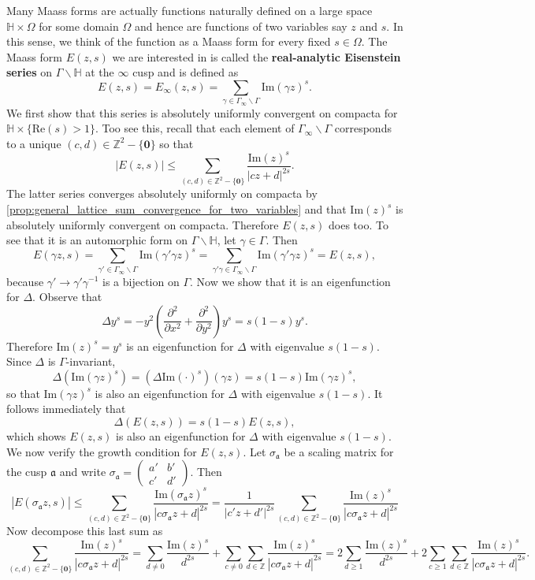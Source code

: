 \documentclass[12pt]{book}
\theoremstyle{definition}\newframedtheorem{method}{Method}
\newcommand{\mf}{\mathfrak}
\newcommand{\Z}{\mathbb{Z}}
\renewcommand{\H}{\mathbb{H}}
\newcommand{\g}{\gamma}
\newcommand{\s}{\sigma}
\newcommand{\G}{\Gamma}
\newcommand{\D}{\Delta}
\newcommand{\W}{\Omega}
\newcommand{\x}{\times}
\newcommand{\del}{\partial}
\newcommand{\<}{\langle}
\renewcommand{\>}{\rangle}
\renewcommand{\Re}{\mathrm{Re}}
\renewcommand{\Im}{\mathrm{Im}}
\newcommand{\GH}{\G\backslash\H}
\newcommand{\GG}{\G_{\infty}\backslash\G}
\begin{document}
      Many Maass forms are actually functions naturally defined on a large space $\H \x \W$ for some domain $\W$ and hence are functions of two variables say $z$ and $s$. In this sense, we think of the function as a Maass form for every fixed $s \in \W$. The Maass form $E(z,s)$ we are interested in is called the \textbf{real-analytic Eisenstein series} on $\GH$ at the $\infty$ cusp and is defined as
      \[
        E(z,s) = E_{\infty}(z,s) = \sum_{\g \in \GG}\Im(\g z)^{s}.
      \]
      We first show that this series is absolutely uniformly convergent on compacta for $\H \x \{\Re(s) > 1\}$. Too see this, recall that each element of $\GG$ corresponds to a unique $(c,d) \in \Z^{2}-\{\mathbf{0}\}$ so that
      \[
        |E(z,s)| \le \sum_{(c,d) \in \Z^{2}-\{\mathbf{0}\}}\frac{\Im(z)^{s}}{|cz+d|^{2s}}.
      \]
      The latter series converges absolutely uniformly on compacta by \cref{prop:general_lattice_sum_convergence_for_two_variables} and that $\Im(z)^{s}$ is absolutely uniformly convergent on compacta. Therefore $E(z,s)$ does too. To see that it is an automorphic form on $\GH$, let $\g \in \G$. Then
      \[
        E(\g z,s) = \sum_{\g' \in \GG}\Im(\g'\g z)^{s} = \sum_{\g'\g \in \GG}\Im(\g'\g z)^{s} = E(z,s),
      \]
      because $\g' \to \g'\g^{-1}$ is a bijection on $\G$. Now we show that it is an eigenfunction for $\D$. Observe that
      \[
        \D y^{s} = -y^{2}\left(\frac{\del^{2}}{\del x^{2}}+\frac{\del^{2}}{\del y^{2}}\right)y^{s} = s(1-s)y^{s}.
      \]
      Therefore $\Im(z)^{s} = y^{s}$ is an eigenfunction for $\D$ with eigenvalue $s(1-s)$. Since $\D$ is $\G$-invariant,
      \[
        \D(\Im(\g z)^{s}) = (\D\Im(\cdot)^{s})(\g z) = s(1-s)\Im(\g z)^{s},
      \]
      so that $\Im(\g z)^{s}$ is also an eigenfunction for $\D$ with eigenvalue $s(1-s)$. It follows immediately that
      \[
        \D(E(z,s)) = s(1-s)E(z,s),
      \]
      which shows $E(z,s)$ is also an eigenfunction for $\D$ with eigenvalue $s(1-s)$. We now verify the growth condition for $E(z,s)$. Let $\s_{\mf{a}}$ be a scaling matrix for the cusp $\mf{a}$ and write $\s_{\mf{a}} = \begin{pmatrix} a' & b' \\ c' & d' \end{pmatrix}$. Then
      \[
        |E(\s_{\mf{a}}z,s)| \le \sum_{(c,d) \in \Z^{2}-\{\mathbf{0}\}}\frac{\Im(\s_{\mf{a}}z)^{s}}{|c\s_{\mf{a}}z+d|^{2s}} = \frac{1}{|c'z+d'|^{2s}}\sum_{(c,d) \in \Z^{2}-\{\mathbf{0}\}}\frac{\Im(z)^{s}}{|c\s_{\mf{a}}z+d|^{2s}}
      \]
      Now decompose this last sum as
      \[
        \sum_{(c,d) \in \Z^{2}-\{\mathbf{0}\}}\frac{\Im(z)^{s}}{|c\s_{\mf{a}}z+d|^{2s}} = \sum_{d \neq 0}\frac{\Im(z)^{s}}{d^{2s}}+\sum_{c \neq 0}\sum_{d \in \Z}\frac{\Im(z)^{s}}{|c\s_{\mf{a}}z+d|^{2s}} = 2\sum_{d \ge 1}\frac{\Im(z)^{s}}{d^{2s}}+2\sum_{c \ge 1}\sum_{d \in \Z}\frac{\Im(z)^{s}}{|c\s_{\mf{a}}z+d|^{2s}}.
      \]
\end{document}

